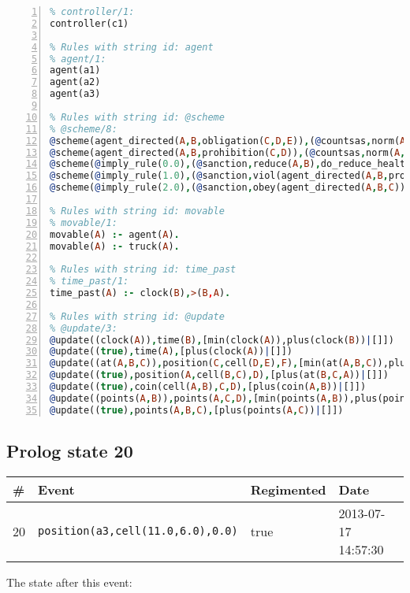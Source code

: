 \documentclass[11pt]{article}\usepackage[utf8]{inputenc}\usepackage{geometry}
\begin{document}
\begin{lstlisting}[language=Prolog, numbers=left]
% Rules with string id: controller
% controller/1:
controller(c1)

% Rules with string id: agent
% agent/1:
agent(a1)
agent(a2)
agent(a3)

% Rules with string id: @scheme
% @scheme/8:
@scheme(agent_directed(A,B,obligation(C,D,E)),(@countsas,norm(A,B,F,obligation(C,D,E)),F),false,(listTrue(C)),(time_past(D)),false,[plus(viol(agent_directed(A,B,obligation(C,D,E))))|[]],[plus(obey(agent_directed(A,B,obligation(C,D,E))))|[]])
@scheme(agent_directed(A,B,prohibition(C,D)),(@countsas,norm(A,B,E,prohibition(C,D)),E),(listTrue(C)),false,(false),false,[plus(viol(agent_directed(A,B,prohibition(C,D))))|[]],[plus(obey(agent_directed(A,B,prohibition(C,D))))|[]])
@scheme(@imply_rule(0.0),(@sanction,reduce(A,B),do_reduce_health(A,B),notifyAgent(A,changed(status))),true,false,false,false,[min(reduce(A,B))|[]],[])
@scheme(@imply_rule(1.0),(@sanction,viol(agent_directed(A,B,prohibition(C,D))),do_sanction(D)),true,false,false,false,[min(viol(agent_directed(A,B,prohibition(C,D))))|[]],[])
@scheme(@imply_rule(2.0),(@sanction,obey(agent_directed(A,B,C))),true,false,false,false,[min(obey(agent_directed(A,B,C)))|[]],[])

% Rules with string id: movable
% movable/1:
movable(A) :- agent(A).
movable(A) :- truck(A).

% Rules with string id: time_past
% time_past/1:
time_past(A) :- clock(B),>(B,A).

% Rules with string id: @update
% @update/3:
@update((clock(A)),time(B),[min(clock(A)),plus(clock(B))|[]])
@update((true),time(A),[plus(clock(A))|[]])
@update((at(A,B,C)),position(C,cell(D,E),F),[min(at(A,B,C)),plus(at(D,E,C))|[]])
@update((true),position(A,cell(B,C),D),[plus(at(B,C,A))|[]])
@update((true),coin(cell(A,B),C,D),[plus(coin(A,B))|[]])
@update((points(A,B)),points(A,C,D),[min(points(A,B)),plus(points(A,D))|[]])
@update((true),points(A,B,C),[plus(points(A,C))|[]])

\end{lstlisting}
\clearpage 
\subsection{Prolog state 20}
\begin{table}[ht]
\centering 
\begin{tabular}{l l l l} 
\textbf{\#} & \textbf{Event} & \textbf{Regimented} & \textbf{Date} \\ [0.5ex] 
\hline
20&\texttt{position(a3,cell(11.0,6.0),0.0)}&true&2013-07-17 14:57:30\\ [1ex] \hline\end{tabular}
\end{table}
The state after this event:
\end{document}
